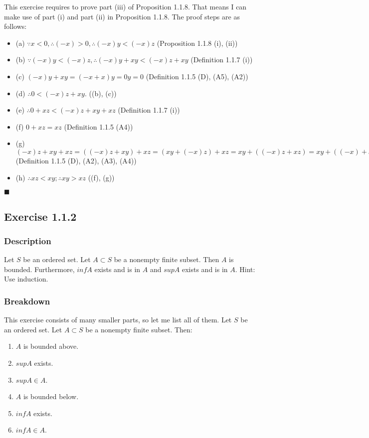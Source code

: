 \documentclass[12pt, letterpaper, oneside]{book}
\begin{document}
This exercise requires to prove part (iii) of Proposition 1.1.8. That means I can make use of part (i) and part (ii) in
Proposition 1.1.8. The proof steps are as follows:
\begin{itemize}
  \item (a) $\because x < 0, \therefore (-x) > 0, \therefore (-x)y < (-x)z$ (Proposition 1.1.8 (i), (ii))
  \item (b) $\because (-x)y < (-x)z, \therefore (-x)y + xy < (-x)z + xy$ (Definition 1.1.7 (i))
  \item (c) $(-x)y + xy = (-x + x)y = 0y = 0$ (Definition 1.1.5 (D), (A5), (A2))
  \item (d) $\therefore 0 < (-x)z + xy$. ((b), (c))
  \item (e) $\therefore 0 + xz < (-x)z + xy + xz$ (Definition 1.1.7 (i))
  \item (f) $0 + xz = xz$ (Definition 1.1.5 (A4))
  \item (g) $(-x)z + xy + xz = \left((-x)z + xy\right) + xz = \left(xy + (-x)z\right) + xz =
          xy + \left((-x)z + xz \right) = xy + \left((-x) + x\right)z = xy + 0z = xy + 0 = xy$ (Definition 1.1.5 (D),
        (A2), (A3), (A4))
  \item (h) $\therefore xz < xy; \therefore xy > xz$ ((f), (g))
\end{itemize}

$\blacksquare$

\subsection{Exercise 1.1.2}

\subsubsection{Description}

Let $S$ be an ordered set. Let $A \subset S$ be a nonempty finite subset. Then $A$ is bounded. Furthermore, $inf A$
exists and is in $A$ and $sup A$ exists and is in $A$. Hint: Use induction.

\subsubsection{Breakdown}

This exercise consists of many smaller parts, so let me list all of them. Let $S$ be an ordered set. Let $A \subset S$
be a nonempty finite subset. Then:
\begin{enumerate}
  \item[(1a)] $A$ is bounded above.
  \item[(1b)] $sup A$ exists.
  \item[(1c)] $sup A \in A$.
  \item[(2a)] $A$ is bounded below.
  \item[(2b)] $inf A$ exists.
  \item[(2c)] $inf A \in A$.
\end{enumerate}
\end{document}
